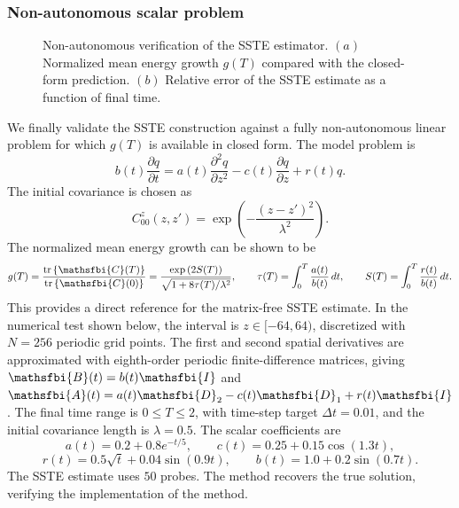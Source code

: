 \subsubsection{Non-autonomous scalar problem}
\label{sec:appendix_verification_nonautonomous}
\begin{figure}[t]
    \centering
    \begin{minipage}[t]{0.49\textwidth}
        \centering
        \vspace{0pt}
        
    \end{minipage}
    \hfill
    \begin{minipage}[t]{0.49\textwidth}
        \centering
        \vspace{0pt}
        
    \end{minipage}
    \caption{Non-autonomous verification of the SSTE estimator. \((a)\) Normalized mean energy growth \(g(T)\) compared with the closed-form prediction. \((b)\) Relative error of the SSTE estimate as a function of final time.}
    \label{fig:nonautonomous_hutchpp}
\end{figure}
We finally validate the SSTE construction against a fully non-autonomous linear problem for which \(g(T)\) is available in closed form. The model problem is
\begin{equation}
  b(t)\frac{\partial q}{\partial t}
  =
  a(t)\frac{\partial^2 q}{\partial z^2}
  -
  c(t)\frac{\partial q}{\partial z}
  +
  r(t)q .
\end{equation}
The initial covariance is chosen as
\begin{equation}
  C_{00}^{z}(z,z')
  =
  \exp\left(
    -\frac{(z-z')^2}{\lambda^2}
  \right).
\end{equation}
The normalized mean energy growth can be shown to be
\begin{equation}
  g(T)
  =
  \frac{\tr\left\{\mathsfbi{C}(T)\right\}}{\tr\left\{\mathsfbi{C}(0)\right\}}
  =
  \frac{
    \exp\left(2S(T)\right)
  }{
    \sqrt{1+8\tau(T)/\lambda^2}
  },
  \qquad
  \tau(T)=\int_0^T \frac{a(t)}{b(t)}\,dt,
  \qquad
  S(T)=\int_0^T \frac{r(t)}{b(t)}\,dt .
\end{equation}
This provides a direct reference for the matrix-free SSTE estimate. In the numerical test shown below, the interval is \(z\in[-64,64)\), discretized with \(N=256\) periodic grid points. The first and second spatial derivatives are approximated with eighth-order periodic finite-difference matrices, giving \(\mathsfbi{B}(t)=b(t)\mathsfbi{I}\) and \(\mathsfbi{A}(t)=a(t)\mathsfbi{D}_2-c(t)\mathsfbi{D}_1+r(t)\mathsfbi{I}\). The final time range is \(0\le T\le 2\), with time-step target \(\Delta t=0.01\), and the initial covariance length is \(\lambda=0.5\). The scalar coefficients are
\begin{equation}
  a(t)=0.2+0.8e^{-t/5},\qquad
  c(t)=0.25+0.15\cos(1.3t),
\end{equation}
\begin{equation}
  r(t)=0.5\sqrt{t}+0.04\sin(0.9t),\qquad
  b(t)=1.0+0.2\sin(0.7t).
\end{equation}
The SSTE estimate uses \(50\) probes. The method recovers the true solution, verifying the implementation of the method.


